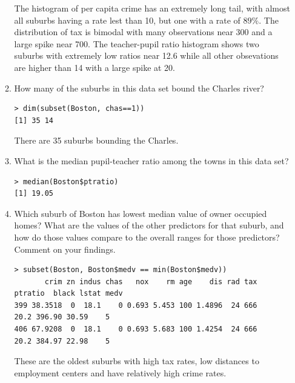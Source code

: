 \documentclass[11pt]{article}
\begin{document}
\begin{enumerate}
\begin{enumerate}
The histogram of per capita crime has an extremely long tail, with almost all suburbs having a rate lest than 10, but one with a rate of $89\%$.  The distribution of tax is bimodal with many observations near 300 and a large spike near 700.  The teacher-pupil ratio histogram shows two suburbs with extremely low ratios near 12.6 while all other obsevations are higher than 14 with a large spike at 20.

\item How many of the suburbs in this data set bound the Charles river?
\begin{lstlisting}
> dim(subset(Boston, chas==1))
[1] 35 14
\end{lstlisting}

There are 35 suburbs bounding the Charles.
\item What is the median pupil-teacher ratio among the towns in this data set?
\begin{lstlisting}
> median(Boston$ptratio)
[1] 19.05
\end{lstlisting}
\item Which suburb of Boston has lowest median value of owner occupied homes?  What are the values of the other predictors for that suburb, and how do those values compare to the overall ranges for those predictors?  Comment on your findings.
\begin{lstlisting}
> subset(Boston, Boston$medv == min(Boston$medv))
       crim zn indus chas   nox    rm age    dis rad tax ptratio  black lstat medv
399 38.3518  0  18.1    0 0.693 5.453 100 1.4896  24 666    20.2 396.90 30.59    5
406 67.9208  0  18.1    0 0.693 5.683 100 1.4254  24 666    20.2 384.97 22.98    5
\end{lstlisting}
These are the oldest suburbs with high tax rates, low distances to employment centers and have relatively high crime rates.


\end{enumerate}
\end{enumerate}
\end{document}

